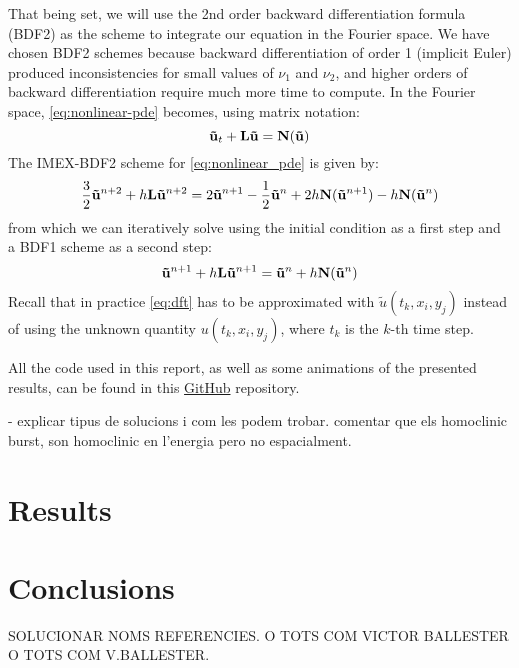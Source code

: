 \documentclass[twoside]{article}
\begin{document}
That being set, we will use the 2nd order backward differentiation formula (BDF2) as the scheme to integrate our equation in the Fourier space. We have chosen BDF2 schemes because backward differentiation of order 1 (implicit Euler) produced inconsistencies for small values of $\nu_1$ and $\nu_2$, and higher orders of backward differentiation require much more time to compute. In the Fourier space, \cref{eq:nonlinear-pde} becomes, using matrix notation:
\begin{equation}
  \boldsymbol{\mathrm{\tilde{u}}}_t+\boldsymbol{\mathrm{L}}\boldsymbol{\mathrm{\tilde{u}}}=\boldsymbol{\mathrm{N}}(\boldsymbol{\mathrm{\tilde{u}}})
\end{equation}
The IMEX-BDF2 scheme for \cref{eq:nonlinear_pde} is given by:
\begin{equation}
  \frac{3}{2} \boldsymbol{\mathrm{\tilde{u}}}^{n+2} +h \boldsymbol{\mathrm{L}} \boldsymbol{\mathrm{\tilde{u}}}^{n+2} = 2 \boldsymbol{\mathrm{\tilde{u}}}^{n+1} - \frac{1}{2} \boldsymbol{\mathrm{\tilde{u}}}^{n} + 2h \boldsymbol{\mathrm{N}}(\boldsymbol{\mathrm{\tilde{u}}}^{n+1}) -  h \boldsymbol{\mathrm{N}}(\boldsymbol{\mathrm{\tilde{u}}}^{n})
\end{equation}
from which we can iteratively solve using the initial condition as a first step and a BDF1 scheme as a second step:
\begin{equation}
  \boldsymbol{\mathrm{\tilde{u}}}^{n+1} + h \boldsymbol{\mathrm{L}} \boldsymbol{\mathrm{\tilde{u}}}^{n+1} = \boldsymbol{\mathrm{\tilde{u}}}^{n} + h \boldsymbol{\mathrm{N}}(\boldsymbol{\mathrm{\tilde{u}}}^{n})
\end{equation}
Recall that in practice \cref{eq:dft} has to be approximated with $\tilde{u}(t_k,x_i,y_j)$ instead of using the unknown quantity $u(t_k,x_i,y_j)$, where $t_k$ is the $k$-th time step.

All the code used in this report, as well as some animations of the presented results, can be found in this \href{https://github.com/victorballester7/2d-kuramoto-sivashinsky}{GitHub} repository.

- explicar tipus de solucions i com les podem trobar. comentar que els homoclinic burst, son homoclinic en l'energia pero no espacialment.
\section{Results}
\section{Conclusions}

{}
\printbibliography
SOLUCIONAR NOMS REFERENCIES. O TOTS COM VICTOR BALLESTER O TOTS COM V.BALLESTER.
\end{document}
